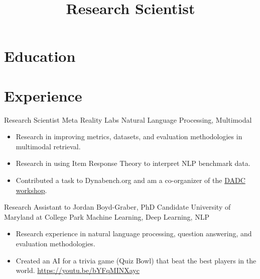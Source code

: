 \documentclass[11pt,a4paper,sans]{moderncv} %
\title{Research Scientist}
\begin{document}
\makecvtitle %
\vspace{-7ex}

\section{Education}





\section{Experience}
		{Research Scientist}
		{Meta Reality Labs}
		{Natural Language Processing, Multimodal}
		{}
		{
			\begin{itemize}
				\item Research in improving metrics, datasets, and evaluation methodologies in multimodal retrieval.
				\item Research in using Item Response Theory to interpret NLP benchmark data.
				\item Contributed a task to Dynabench.org and am a co-organizer of the \href{https://dadcworkshop.github.io/}{DADC workshop}.
			\end{itemize}
		}

		{Research Assistant to Jordan Boyd-Graber, PhD Candidate}
		{University of Maryland at College Park}
		{Machine Learning, Deep Learning, NLP}
		{}
		{
			\begin{itemize}
			\item Research experience in natural language processing, question answering, and evaluation methodologies.
      \item Created an AI for a trivia game (Quiz Bowl) that beat the best players in the world. \url{https://youtu.be/bYFqMINXayc}
			\end{itemize}
		}
\end{document}
